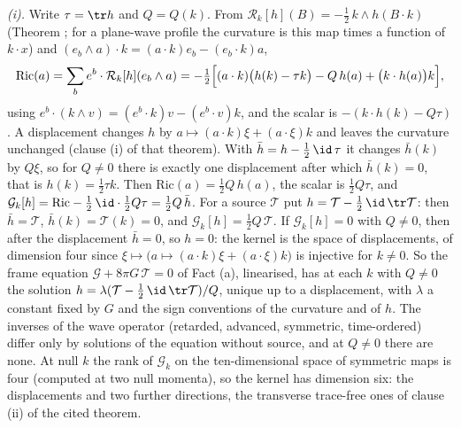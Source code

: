 \emph{(i).} Write $\tau = \tr h$ and $Q = Q(k)$. From $\mathcal{R}_{k}[h](B) = -\tfrac12\,k \wedge h(B \cdot k)$ (Theorem ; for a plane-wave profile the curvature is this map times a function of $k \cdot x$) and $(e_{b} \wedge a) \cdot k = (a \cdot k)e_{b} - (e_{b} \cdot k)a$,
\[
\mathrm{Ric}(a) = \sum_{b} e^{b} \cdot \mathcal{R}_{k}[h](e_{b} \wedge a) = -\tfrac12\Bigl[(a \cdot k)\bigl(h(k) - \tau k\bigr) - Q\,h(a) + \bigl(k \cdot h(a)\bigr)k\Bigr],
\]
using $e^{b} \cdot (k \wedge v) = (e^{b} \cdot k)v - (e^{b} \cdot v)k$, and the scalar is $-(k \cdot h(k) - Q\tau)$. A displacement changes $h$ by $a \mapsto (a \cdot k)\xi + (a \cdot \xi)k$ and leaves the curvature unchanged (clause (i) of that theorem). With $\bar h = h - \tfrac12\,\id\,\tau$ it changes $\bar h(k)$ by $Q\xi$, so for $Q \neq 0$ there is exactly one displacement after which $\bar h(k) = 0$, that is $h(k) = \tfrac12\tau k$. Then $\mathrm{Ric}(a) = \tfrac12 Q\,h(a)$, the scalar is $\tfrac12 Q\tau$, and $\mathcal{G}_{k}[h] = \mathrm{Ric} - \tfrac12\,\id\cdot\tfrac12 Q\tau = \tfrac12 Q\,\bar h$. For a source $\mathcal{T}$ put $h = \mathcal{T} - \tfrac12\,\id\,\tr\mathcal{T}$: then $\bar h = \mathcal{T}$, $\bar h(k) = \mathcal{T}(k) = 0$, and $\mathcal{G}_{k}[h] = \tfrac12 Q\,\mathcal{T}$. If $\mathcal{G}_{k}[h] = 0$ with $Q \neq 0$, then after the displacement $\bar h = 0$, so $h = 0$: the kernel is the space of displacements, of dimension four since $\xi \mapsto \bigl(a \mapsto (a \cdot k)\xi + (a \cdot \xi)k\bigr)$ is injective for $k \neq 0$. So the frame equation $\mathcal{G} + 8\pi G\,\mathcal{T} = 0$ of Fact (a), linearised, has at each $k$ with $Q \neq 0$ the solution $h = \lambda(\mathcal{T} - \tfrac12\,\id\,\tr\mathcal{T})/Q$, unique up to a displacement, with $\lambda$ a constant fixed by $G$ and the sign conventions of the curvature and of $h$. The inverses of the wave operator (retarded, advanced, symmetric, time-ordered) differ only by solutions of the equation without source, and at $Q \neq 0$ there are none. At null $k$ the rank of $\mathcal{G}_{k}$ on the ten-dimensional space of symmetric maps is four (computed at two null momenta), so the kernel has dimension six: the displacements and two further directions, the transverse trace-free ones of clause (ii) of the cited theorem.


